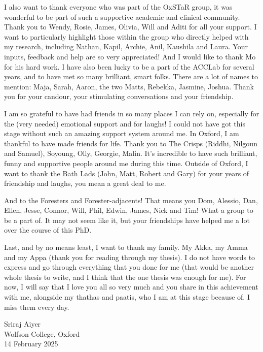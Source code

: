 \documentclass[a4paper, nobind]{templates/ociamthesis}
\begin{document}
\begin{romanpages}
\begin{acknowledgements}
 \hfill\break
 I also want to thank everyone who was part of the OxSTaR group, it was wonderful to be part of such a supportive academic and clinical community. Thank you to Wendy, Rosie, James, Olivia, Will and Aditi for all your support. I want to particularly highlight those within the group who directly helped with my research, including Nathan, Kapil, Archie, Anil, Kaushila and Laura. Your inputs, feedback and help are so very appreciated! And I would like to thank Mo for his hard work. I have also been lucky to be a part of the ACCLab for several years, and to have met so many brilliant, smart folks. There are a lot of names to mention: Maja, Sarah, Aaron, the two Matts, Rebekka, Jasmine, Joshua. Thank you for your candour, your stimulating conversations and your friendship.

 \hfill\break
 I am so grateful to have had friends in so many places I can rely on, especially for the (very needed) emotional support and for laughs! I could not have got this stage without such an amazing support system around me. In Oxford, I am thankful to have made friends for life. Thank you to The Crisps (Riddhi, Nilgoun and Samuel), Soyoung, Olly, Georgie, Malin. It's incredible to have such brilliant, funny and supportive people around me during this time. Outside of Oxford, I want to thank the Bath Lads (John, Matt, Robert and Gary) for your years of friendship and laughs, you mean a great deal to me.

 \hfill\break
 And to the Foresters and Forester-adjacents! That means you Dom, Alessio, Dan, Ellen, Jesse, Connor, Will, Phil, Edwin, James, Nick and Tim! What a group to be a part of. It may not seem like it, but your friendships have helped me a lot over the course of this PhD.

 \hfill\break
 Last, and by no means least, I want to thank my family. My Akka, my Amma and my Appa (thank you for reading through my thesis). I do not have words to express and go through everything that you done for me (that would be another whole thesis to write, and I think that the one thesis was enough for me). For now, I will say that I love you all so very much and you share in this achievement with me, alongside my thathas and paatis, who I am at this stage because of. I miss them every day.

 \begin{flushright}
 Sriraj Aiyer\\
 Wolfson College, Oxford \\
 14 February 2025
 \end{flushright}
\end{acknowledgements}




\end{romanpages}
\end{document}
